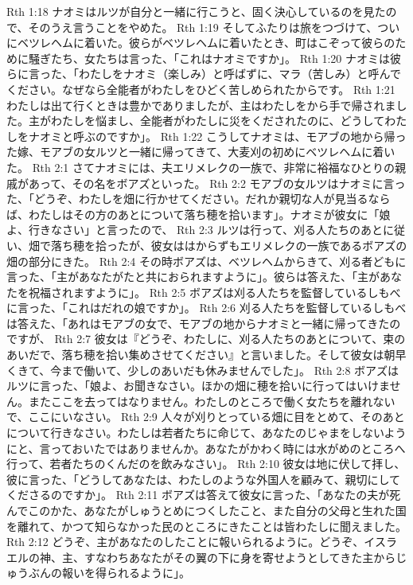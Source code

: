 Rth 1:18  ナオミはルツが自分と一緒に行こうと、固く決心しているのを見たので、そのうえ言うことをやめた。
Rth 1:19  そしてふたりは旅をつづけて、ついにベツレヘムに着いた。彼らがベツレヘムに着いたとき、町はこぞって彼らのために騒ぎたち、女たちは言った、「これはナオミですか」。
Rth 1:20  ナオミは彼らに言った、「わたしをナオミ（楽しみ）と呼ばずに、マラ（苦しみ）と呼んでください。なぜなら全能者がわたしをひどく苦しめられたからです。
Rth 1:21  わたしは出て行くときは豊かでありましたが、主はわたしをから手で帰されました。主がわたしを悩まし、全能者がわたしに災をくだされたのに、どうしてわたしをナオミと呼ぶのですか」。
Rth 1:22  こうしてナオミは、モアブの地から帰った嫁、モアブの女ルツと一緒に帰ってきて、大麦刈の初めにベツレヘムに着いた。
Rth 2:1  さてナオミには、夫エリメレクの一族で、非常に裕福なひとりの親戚があって、その名をボアズといった。
Rth 2:2  モアブの女ルツはナオミに言った、「どうぞ、わたしを畑に行かせてください。だれか親切な人が見当るならば、わたしはその方のあとについて落ち穂を拾います」。ナオミが彼女に「娘よ、行きなさい」と言ったので、
Rth 2:3  ルツは行って、刈る人たちのあとに従い、畑で落ち穂を拾ったが、彼女ははからずもエリメレクの一族であるボアズの畑の部分にきた。
Rth 2:4  その時ボアズは、ベツレヘムからきて、刈る者どもに言った、「主があなたがたと共におられますように」。彼らは答えた、「主があなたを祝福されますように」。
Rth 2:5  ボアズは刈る人たちを監督しているしもべに言った、「これはだれの娘ですか」。
Rth 2:6  刈る人たちを監督しているしもべは答えた、「あれはモアブの女で、モアブの地からナオミと一緒に帰ってきたのですが、
Rth 2:7  彼女は『どうぞ、わたしに、刈る人たちのあとについて、束のあいだで、落ち穂を拾い集めさせてください』と言いました。そして彼女は朝早くきて、今まで働いて、少しのあいだも休みませんでした」。
Rth 2:8  ボアズはルツに言った、「娘よ、お聞きなさい。ほかの畑に穂を拾いに行ってはいけません。またここを去ってはなりません。わたしのところで働く女たちを離れないで、ここにいなさい。
Rth 2:9  人々が刈りとっている畑に目をとめて、そのあとについて行きなさい。わたしは若者たちに命じて、あなたのじゃまをしないようにと、言っておいたではありませんか。あなたがかわく時には水がめのところへ行って、若者たちのくんだのを飲みなさい」。
Rth 2:10  彼女は地に伏して拝し、彼に言った、「どうしてあなたは、わたしのような外国人を顧みて、親切にしてくださるのですか」。
Rth 2:11  ボアズは答えて彼女に言った、「あなたの夫が死んでこのかた、あなたがしゅうとめにつくしたこと、また自分の父母と生れた国を離れて、かつて知らなかった民のところにきたことは皆わたしに聞えました。
Rth 2:12  どうぞ、主があなたのしたことに報いられるように。どうぞ、イスラエルの神、主、すなわちあなたがその翼の下に身を寄せようとしてきた主からじゅうぶんの報いを得られるように」。
